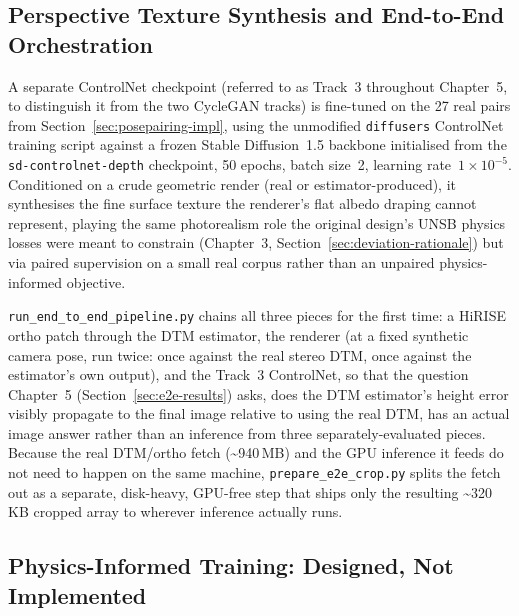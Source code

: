 \subsection{Perspective Texture Synthesis and End-to-End Orchestration}
\label{sec:controlnet-impl}
\label{sec:e2e-impl}

A separate ControlNet checkpoint (referred to as Track~3 throughout Chapter~5, to distinguish it from the two CycleGAN tracks) is fine-tuned on the 27 real pairs from Section~\ref{sec:posepairing-impl}, using the unmodified \texttt{diffusers} ControlNet training script against a frozen Stable Diffusion~1.5 backbone initialised from the \texttt{sd-controlnet-depth} checkpoint, 50 epochs, batch size~2, learning rate~$1{\times}10^{-5}$. Conditioned on a crude geometric render (real or estimator-produced), it synthesises the fine surface texture the renderer's flat albedo draping cannot represent, playing the same photorealism role the original design's UNSB physics losses were meant to constrain (Chapter~3, Section~\ref{sec:deviation-rationale}) but via paired supervision on a small real corpus rather than an unpaired physics-informed objective.

\texttt{run\_end\_to\_end\_pipeline.py} chains all three pieces for the first time: a HiRISE ortho patch through the DTM estimator, the renderer (at a fixed synthetic camera pose, run twice: once against the real stereo DTM, once against the estimator's own output), and the Track~3 ControlNet, so that the question Chapter~5 (Section~\ref{sec:e2e-results}) asks, does the DTM estimator's height error visibly propagate to the final image relative to using the real DTM, has an actual image answer rather than an inference from three separately-evaluated pieces. Because the real DTM/ortho fetch (\textasciitilde940\,MB) and the GPU inference it feeds do not need to happen on the same machine, \texttt{prepare\_e2e\_crop.py} splits the fetch out as a separate, disk-heavy, GPU-free step that ships only the resulting \textasciitilde320\,KB cropped array to wherever inference actually runs.

\subsection{Physics-Informed Training: Designed, Not Implemented}
\label{sec:physics-loss-scoped}

